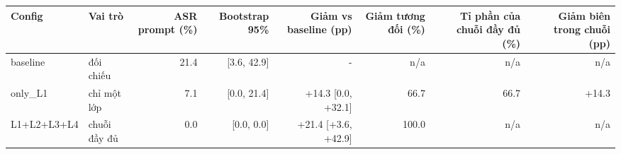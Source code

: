 \begin{tabular}{llrrrrrr}
\toprule
Config & Vai trò & ASR prompt (\%) & Bootstrap 95\% & Giảm vs baseline (pp) & Giảm tương đối (\%) & Tỉ phần của chuỗi đầy đủ (\%) & Giảm biên trong chuỗi (pp) \\
\midrule
baseline & đối chiếu & 21.4 & [3.6, 42.9] & - & n/a & n/a & n/a \\
only\_L1 & chỉ một lớp & 7.1 & [0.0, 21.4] & +14.3 [0.0, +32.1] & 66.7 & 66.7 & +14.3 \\
L1+L2+L3+L4 & chuỗi đầy đủ & 0.0 & [0.0, 0.0] & +21.4 [+3.6, +42.9] & 100.0 & n/a & n/a \\
\bottomrule
\end{tabular}
